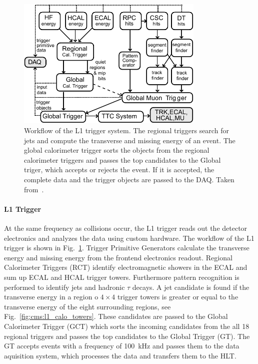 \begin{figure}[htp]
    \centering
    \includegraphics[width=0.8\textwidth]{figures/cms_detector/cms_l1_trigger.pdf}\hfill
    \caption[The L1 Trigger of CMS]{Workflow of the L1 trigger system. The
        regional triggers search for jets and compute the transverse and missing
        energy of an event. The global calorimeter trigger sorts the objects
        from the regional calorimeter triggers and passes the top candidates to
        the Global triger, which accepts or rejects the event. If it is
        accepted, the complete data and the trigger objects are passed to the
        DAQ. Taken from~\cite{Sphicas:2002gg}.} 
    \label{fig:cms:l1_trigger}
\end{figure}

\paragraph{L1 Trigger} 
At the same frequency as collisions occur, the L1 trigger reads out the detector
electronics and analyzes the data using custom hardware. The workflow of the L1
trigger is shown in Fig.~\ref{fig:cms:l1_trigger}. Trigger Primitive Generators
calculate the transverse energy and missing energy from the frontend electronics
readout. Regional Calorimeter Triggers (RCT) identify electromagnetic showers
in the ECAL and sum up ECAL and HCAL trigger towers. Furthermore pattern
recognition is performed to identify jets and hadronic $\tau$ decays. A jet
candidate is found if the transverse energy in a region o $4\times4$ trigger
towers is greater or equal to the transverse energy of the eight surrounding
regions, see Fig.~\ref{fig:cms:l1_calo_towers}. These
candidates are passed to the Global Calorimeter Trigger (GCT) which sorts the
incoming candidates from the all 18 regional triggers and passes the top
candidates to the Global Trigger (GT). The GT accepts events with a frequency
of \SI{100}{\kilo\hertz} and passes them to the data aquisition system, which
processes the data and transfers them to the HLT.

